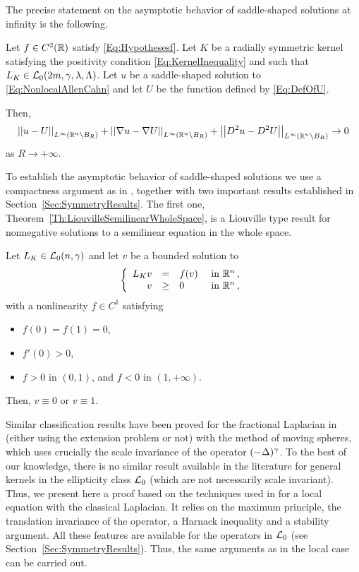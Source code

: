 The precise statement on the asymptotic behavior of saddle-shaped solutions at infinity is the following.

\begin{theorem}
	\label{Th:AsymptoticBehaviorSaddleSolution}
	Let $f\in C^2(\mathbb{R})$ satisfy \eqref{Eq:Hypothesesf}. Let $K$ be a radially symmetric kernel satisfying the positivity condition \eqref{Eq:KernelInequality} and such that $L_K\in \mathcal{L}_0(2m, \gamma, \lambda, \Lambda)$. Let $u$ be a saddle-shaped solution to \eqref{Eq:NonlocalAllenCahn} and let $U$ be the function defined by \eqref{Eq:DefOfU}.
	
	Then,
	$$
	\left | \left |{u-U} \right | \right |_{L^\infty(\mathbb{R}^n\setminus B_R)}
	+\left | \left |{\nabla u-\nabla U} \right | \right |_{L^\infty(\mathbb{R}^n\setminus B_R)}
	+\left | \left |{D^2u-D^2U} \right | \right |_{L^\infty(\mathbb{R}^n\setminus B_R)} \to 0
	$$
	as $ R\to +\infty$.
\end{theorem}

To establish the asymptotic behavior of saddle-shaped solutions we use a compactness argument as in \cite{CabreTerraII, Cinti-Saddle, Cinti-Saddle2}, together with two important results established in Section~\ref{Sec:SymmetryResults}. The first one, Theorem~\ref{Th:LiouvilleSemilinearWholeSpace}, is a Liouville type result for nonnegative solutions to a semilinear equation in the whole space. 

\begin{theorem}
	\label{Th:LiouvilleSemilinearWholeSpace}
	Let $L_K \in \mathcal{L}_0(n,\gamma)$ and let $v$ be a bounded solution to
	\begin{equation}
	\label{Eq:PositiveWholeSpace}
	\left\{\begin{array}{rcll}
	L_K v &=& f(v) & \textrm{ in }\mathbb{R}^n\,,\\
	v &\geq& 0 & \textrm{ in } \mathbb{R}^n\,,
	\end{array} \right.
	\end{equation}
	with a nonlinearity $f\in C^1$ satisfying
	\begin{itemize}
		\item $f(0) = f(1) = 0$,
		\item $f'(0)>0$,
		\item $f>0$ in $(0,1)$, and $f<0$ in $(1,+\infty)$.
	\end{itemize}
	Then, $v\equiv 0$ or $v \equiv 1$.
\end{theorem}

Similar classification results have been proved for the fractional Laplacian in \cite{ChenLiZhang,LiZhang} (either using the extension problem or not) with the method of moving spheres, which uses crucially the scale invariance of the operator $(-\Delta)^\gamma$. To the best of our knowledge, there is no similar result available in the literature for general kernels in the ellipticity class $\mathcal{L}_0$ (which are not necessarily scale invariant). Thus, we present here a proof based on the techniques used in \cite{BerestyckiHamelNadi} for a local equation with the classical Laplacian. It relies on the maximum principle, the translation invariance of the operator, a Harnack inequality and a stability argument. All these features are available for the operators in $\mathcal{L}_0$ (see Section~\ref{Sec:SymmetryResults}). Thus, the same arguments as in the local case can be carried out.

